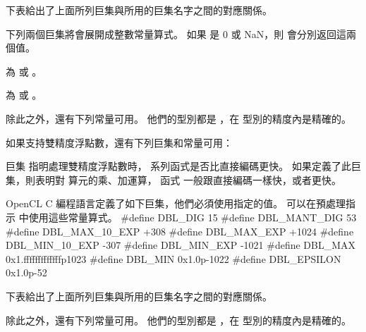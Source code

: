 下表給出了上面所列巨集與所用的巨集名字之間的對應關係。



下列兩個巨集將會展開成整數常量算式。
如果  是 0 或 NaN，則  會分別返回這兩個值。
\startigBase
\item {} 為  或 。
\item {} 為  或 。
\stopigBase

除此之外，還有下列常量可用。
他們的型別都是 ，在  型別的精度內是精確的。



如果支持雙精度浮點數，還有下列巨集和常量可用：
\startigBase
\item 巨集  指明處理雙精度浮點數時，
  系列函式是否比直接編碼更快。
如果定義了此巨集，則表明對  算元的乘、加運算，
函式  一般跟直接編碼一樣快，或者更快。
\stopigBase

OpenCL C 編程語言定義了如下巨集，他們必須使用指定的值。
可以在預處理指示  中使用這些常量算式。
\startclc
#define DBL_DIG		15
#define DBL_MANT_DIG	53
#define DBL_MAX_10_EXP	+308
#define DBL_MAX_EXP	+1024
#define DBL_MIN_10_EXP	-307
#define DBL_MIN_EXP	-1021
#define DBL_MAX		0x1.fffffffffffffp1023
#define DBL_MIN		0x1.0p-1022
#define DBL_EPSILON	0x1.0p-52
\stopclc

下表給出了上面所列巨集與所用的巨集名字之間的對應關係。



除此之外，還有下列常量可用。
他們的型別都是 ，在  型別的精度內是精確的。



